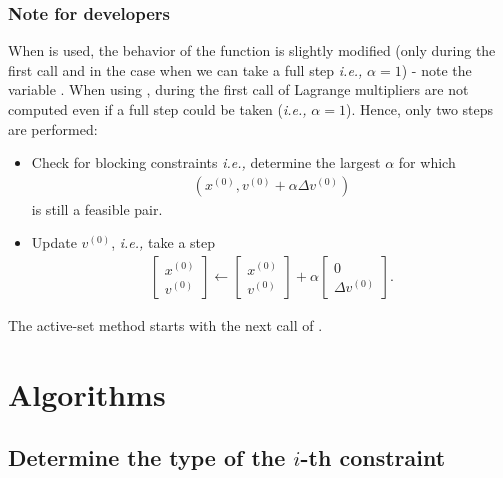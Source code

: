 \documentclass[12pt,a4paper]{article}
\begin{document}
\subsubsection{Note for developers}

When  is used, the behavior of the function  is
slightly modified (only during the first call and in the case when we can take a full step
\emph{i.e.,} $\alpha = 1$) - note the variable . When using
, during the first call of  Lagrange multipliers are
not computed even if a full step could be taken (\emph{i.e.,} $\alpha = 1$). Hence, only two steps
are performed:
%
\begin{itemize}
\item Check for blocking constraints \emph{i.e.,} determine the largest $\alpha$ for which
  \begin{align*}
  (x^{(0)}, v^{(0)} + \alpha \Delta v^{(0)})
  \end{align*}
  is still a feasible pair.

\item Update $v^{(0)}$, \emph{i.e.,} take a step
  \begin{align*}
    \begin{bmatrix} x^{(0)} \\ v^{(0)} \end{bmatrix} \leftarrow
    \begin{bmatrix} x^{(0)} \\ v^{(0)} \end{bmatrix} +
    \alpha\begin{bmatrix} 0 \\ \Delta v^{(0)} \end{bmatrix}.
  \end{align*}
\end{itemize}
%
The active-set method starts with the next call of .

\clearpage

\section{Algorithms}

\subsection{Determine the type of the $i$-th constraint}
\end{document}
